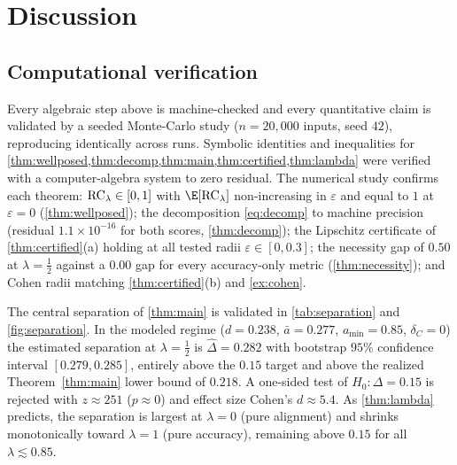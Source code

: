 \section{Discussion}
\label{sec:discussion}

\subsection{Computational verification}
Every algebraic step above is machine-checked and every quantitative claim is
validated by a seeded Monte-Carlo study ($n=20{,}000$ inputs, seed $42$),
reproducing identically across runs. Symbolic identities and inequalities for
\cref{thm:wellposed,thm:decomp,thm:main,thm:certified,thm:lambda} were verified with
a computer-algebra system to zero residual. The numerical study confirms each
theorem: $\mathrm{RC}_\lambda\in[0,1]$ with $\E[\RC_\lambda]$ non-increasing in
$\varepsilon$ and equal to $1$ at $\varepsilon=0$ (\cref{thm:wellposed}); the
decomposition \eqref{eq:decomp} to machine precision (residual $1.1\times10^{-16}$
for both scores, \cref{thm:decomp}); the Lipschitz certificate of
\cref{thm:certified}(a) holding at all tested radii $\varepsilon\in[0,0.3]$; the
necessity gap of $0.50$ at $\lambda=\tfrac12$ against a $0.00$ gap for every
accuracy-only metric (\cref{thm:necessity}); and Cohen radii matching
\cref{thm:certified}(b) and \cref{ex:cohen}.

The central separation of \cref{thm:main} is validated in \cref{tab:separation} and
\cref{fig:separation}. In the modeled regime ($d=0.238$, $\bar a=0.277$,
$a_{\min}=0.85$, $\delta_C=0$) the estimated separation at $\lambda=\tfrac12$ is
$\widehat\Delta=0.282$ with bootstrap $95\%$ confidence interval $[0.279,0.285]$,
entirely above the $0.15$ target and above the realized Theorem~\ref{thm:main} lower
bound of $0.218$. A one-sided test of $H_0:\Delta=0.15$ is rejected with
$z\approx251$ ($p\approx0$) and effect size Cohen's $d\approx5.4$. As
\cref{thm:lambda} predicts, the separation is largest at $\lambda=0$ (pure
alignment) and shrinks monotonically toward $\lambda=1$ (pure accuracy), remaining
above $0.15$ for all $\lambda\lesssim0.85$.


